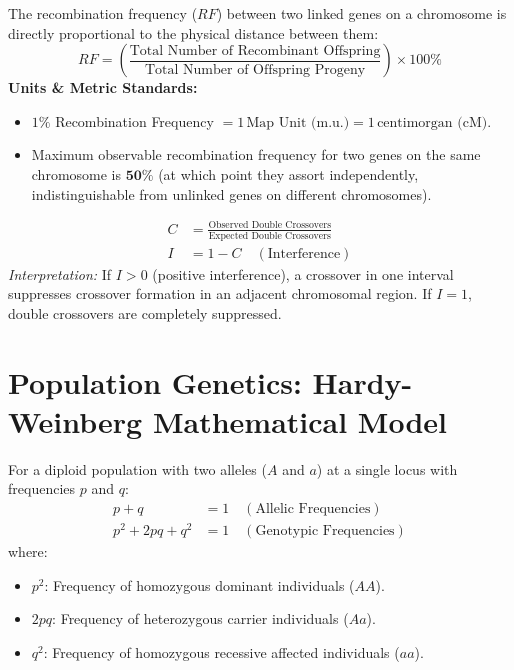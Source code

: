 \documentclass[10pt,twoside,openright]{book}
\begin{document}
\begin{formulabox}
The recombination frequency ($RF$) between two linked genes on a chromosome is directly proportional to the physical distance between them:
\begin{equation}
  RF = \left(\frac{\text{Total Number of Recombinant Offspring}}{\text{Total Number of Offspring Progeny}}\right) \times 100\%
\end{equation}
\textbf{Units \& Metric Standards:}
\begin{itemize}
  \item $1\%$ Recombination Frequency $= 1\,\text{Map Unit (m.u.)} = 1\,\text{centimorgan (cM)}$.
  \item Maximum observable recombination frequency for two genes on the same chromosome is $\mathbf{50\%}$ (at which point they assort independently, indistinguishable from unlinked genes on different chromosomes).
\end{itemize}
\begin{align}
  C &= \frac{\text{Observed Double Crossovers}}{\text{Expected Double Crossovers}} \\
  I &= 1 - C \quad (\text{Interference})
\end{align}
\textit{Interpretation:} If $I > 0$ (positive interference), a crossover in one interval suppresses crossover formation in an adjacent chromosomal region. If $I = 1$, double crossovers are completely suppressed.
\end{formulabox}

\section{Population Genetics: Hardy-Weinberg Mathematical Model}

\begin{formulabox}
For a diploid population with two alleles ($A$ and $a$) at a single locus with frequencies $p$ and $q$:
\begin{align}
  p + q &= 1 \quad (\text{Allelic Frequencies}) \\
  p^2 + 2pq + q^2 &= 1 \quad (\text{Genotypic Frequencies})
\end{align}
where:
\begin{itemize}
  \item $p^2$: Frequency of homozygous dominant individuals ($AA$).
  \item $2pq$: Frequency of heterozygous carrier individuals ($Aa$).
  \item $q^2$: Frequency of homozygous recessive affected individuals ($aa$).
\end{itemize}
\end{formulabox}
\end{document}
